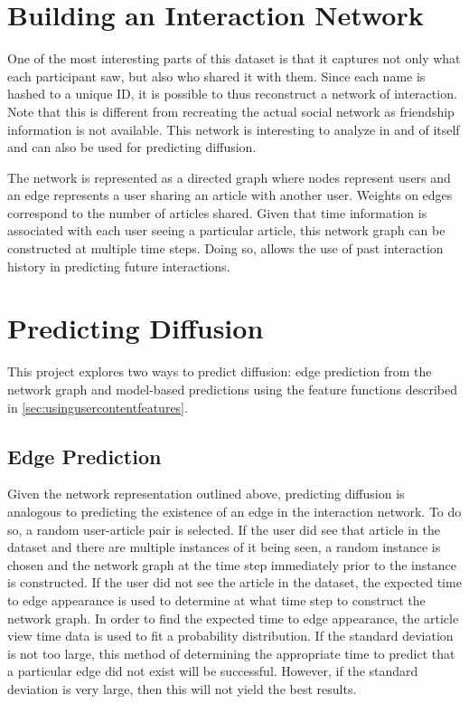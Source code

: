 \section{Building an Interaction Network}
One of the most interesting parts of this dataset is that it captures not only what each participant saw, but also who shared it with them.  Since each name is hashed to a unique ID, it is possible to thus reconstruct a network of interaction.  Note that this is different from recreating the actual social network as friendship information is not available.  This network is interesting to analyze in and of itself and can also be used for predicting diffusion.

The network is represented as a directed graph where nodes represent users and an edge represents a user sharing an article with another user.  Weights on edges correspond to the number of articles shared.  Given that time information is associated with each user seeing a particular article, this network graph can be constructed at multiple time steps.  Doing so, allows the use of past interaction history in predicting future interactions.

\section{Predicting Diffusion}\label{sec:methodsdiffusion}
This project explores two ways to predict diffusion: edge prediction from the network graph and model-based predictions using the feature functions described in \ref{sec:usingusercontentfeatures}.
\subsection{Edge Prediction}
Given the network representation outlined above, predicting diffusion is analogous to predicting the existence of an edge in the interaction network.  To do so, a random user-article pair is selected.  If the user did see that article in the dataset and there are multiple instances of it being seen, a random instance is chosen and the network graph at the time step immediately prior to the instance is constructed.  If the user did not see the article in the dataset, the expected time to edge appearance is used to determine at what time step to construct the network graph.  In order to find the expected time to edge appearance, the article view time data is used to fit a probability distribution.  If the standard deviation is not too large, this method of determining the appropriate time to predict that a particular edge did not exist will be successful.  However, if the standard deviation is very large, then this will not yield the best results.

